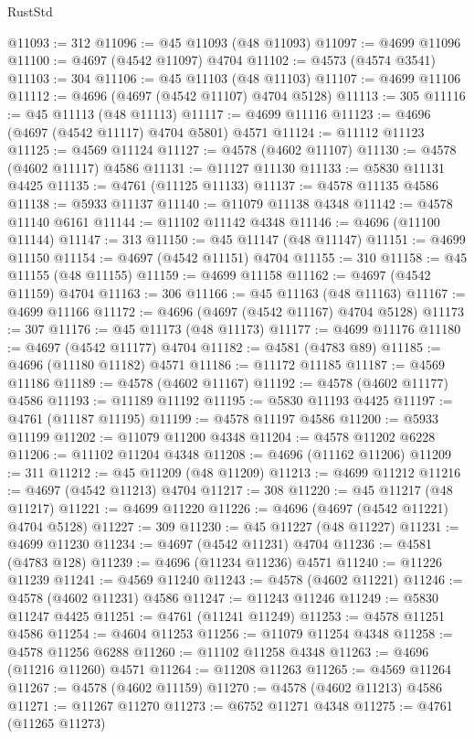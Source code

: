 \begin{lexlean}{RustStd}
\begin{coremodule}
@11093 := 312
@11096 := @45 @11093 (@48 @11093)
@11097 := @4699 @11096
@11100 := @4697 (@4542 @11097) @4704
@11102 := @4573 (@4574 @3541)
@11103 := 304
@11106 := @45 @11103 (@48 @11103)
@11107 := @4699 @11106
@11112 := @4696 (@4697 (@4542 @11107) @4704 @5128)
@11113 := 305
@11116 := @45 @11113 (@48 @11113)
@11117 := @4699 @11116
@11123 := @4696 (@4697 (@4542 @11117) @4704 @5801) @4571
@11124 := @11112 @11123
@11125 := @4569 @11124
@11127 := @4578 (@4602 @11107)
@11130 := @4578 (@4602 @11117) @4586
@11131 := @11127 @11130
@11133 := @5830 @11131 @4425
@11135 := @4761 (@11125 @11133)
@11137 := @4578 @11135 @4586
@11138 := @5933 @11137
@11140 := @11079 @11138 @4348
@11142 := @4578 @11140 @6161
@11144 := @11102 @11142 @4348
@11146 := @4696 (@11100 @11144)
@11147 := 313
@11150 := @45 @11147 (@48 @11147)
@11151 := @4699 @11150
@11154 := @4697 (@4542 @11151) @4704
@11155 := 310
@11158 := @45 @11155 (@48 @11155)
@11159 := @4699 @11158
@11162 := @4697 (@4542 @11159) @4704
@11163 := 306
@11166 := @45 @11163 (@48 @11163)
@11167 := @4699 @11166
@11172 := @4696 (@4697 (@4542 @11167) @4704 @5128)
@11173 := 307
@11176 := @45 @11173 (@48 @11173)
@11177 := @4699 @11176
@11180 := @4697 (@4542 @11177) @4704
@11182 := @4581 (@4783 @89)
@11185 := @4696 (@11180 @11182) @4571
@11186 := @11172 @11185
@11187 := @4569 @11186
@11189 := @4578 (@4602 @11167)
@11192 := @4578 (@4602 @11177) @4586
@11193 := @11189 @11192
@11195 := @5830 @11193 @4425
@11197 := @4761 (@11187 @11195)
@11199 := @4578 @11197 @4586
@11200 := @5933 @11199
@11202 := @11079 @11200 @4348
@11204 := @4578 @11202 @6228
@11206 := @11102 @11204 @4348
@11208 := @4696 (@11162 @11206)
@11209 := 311
@11212 := @45 @11209 (@48 @11209)
@11213 := @4699 @11212
@11216 := @4697 (@4542 @11213) @4704
@11217 := 308
@11220 := @45 @11217 (@48 @11217)
@11221 := @4699 @11220
@11226 := @4696 (@4697 (@4542 @11221) @4704 @5128)
@11227 := 309
@11230 := @45 @11227 (@48 @11227)
@11231 := @4699 @11230
@11234 := @4697 (@4542 @11231) @4704
@11236 := @4581 (@4783 @128)
@11239 := @4696 (@11234 @11236) @4571
@11240 := @11226 @11239
@11241 := @4569 @11240
@11243 := @4578 (@4602 @11221)
@11246 := @4578 (@4602 @11231) @4586
@11247 := @11243 @11246
@11249 := @5830 @11247 @4425
@11251 := @4761 (@11241 @11249)
@11253 := @4578 @11251 @4586
@11254 := @4604 @11253
@11256 := @11079 @11254 @4348
@11258 := @4578 @11256 @6288
@11260 := @11102 @11258 @4348
@11263 := @4696 (@11216 @11260) @4571
@11264 := @11208 @11263
@11265 := @4569 @11264
@11267 := @4578 (@4602 @11159)
@11270 := @4578 (@4602 @11213) @4586
@11271 := @11267 @11270
@11273 := @6752 @11271 @4348
@11275 := @4761 (@11265 @11273)

\end{coremodule}
\end{lexlean}
